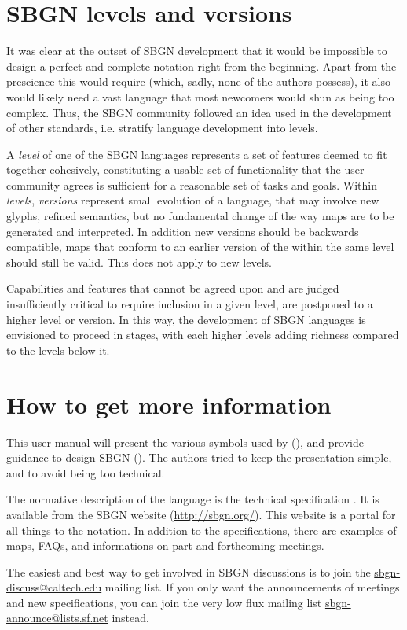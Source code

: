 \section{SBGN levels and versions}
\label{sec:sbgn-levels}

It was clear at the outset of SBGN development that it would be impossible to design a perfect and complete notation right from the beginning.  Apart from the prescience this would require (which, sadly, none of the authors possess), it also would likely need a vast language that most newcomers would shun as being too complex.  Thus, the SBGN community followed an idea used in the development of other standards, i.e. stratify language development into levels.

A \emph{level} of one of the SBGN languages represents a set of features deemed to fit together cohesively, constituting a usable set of functionality that the user community agrees is sufficient for a reasonable set of tasks and goals.  Within \emph{levels}, \emph{versions} represent small evolution of a language, that may involve new glyphs, refined semantics, but no fundamental change of the way maps are to be generated and interpreted. In addition new versions should be backwards compatible, \ie \PD maps that conform to an earlier version of the \PDl within the same level should still be valid.  This does not apply to new levels.

Capabilities and features that cannot be agreed upon and are judged insufficiently critical to require inclusion in a given level, are postponed to a higher level or version.  In this way, the development of SBGN languages is envisioned to proceed in stages, with each higher levels adding richness compared to the levels below it.

\section{How to get more information}
\label{sec:info}

This user manual will present the various symbols used by \SBGNPDLone (), and provide guidance to design SBGN \PDms (). The authors tried to keep the presentation simple, and to avoid being too technical.

The normative description of the language is the technical specification \cite{Moodie:2011}. It is available from the SBGN website (\url{http://sbgn.org/}). This website is a portal for all things to the notation. In addition to the specifications, there are examples of maps, FAQs, and informations on part and forthcoming meetings.

The easiest and best way to get involved in SBGN  discussions is to join the \href{mailto://sbgn-discuss@caltech.edu}{sbgn-discuss@caltech.edu} mailing list. If you only want the announcements of meetings and new specifications, you can join the very low flux mailing list \href{mailto://sbgn-announce@lists.sf.net}{sbgn-announce@lists.sf.net} instead.
